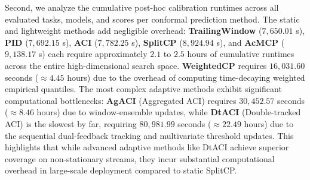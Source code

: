 \documentclass[12pt, a4paper]{article}
\begin{document}
Second, we analyze the cumulative post-hoc calibration runtimes across all evaluated tasks, models, and scores per conformal prediction method. The static and lightweight methods add negligible overhead: \textbf{TrailingWindow} (\(7,650.01\) s), \textbf{PID} (\(7,692.15\) s), \textbf{ACI} (\(7,782.25\) s), \textbf{SplitCP} (\(8,924.94\) s), and \textbf{AcMCP} (\(9,138.17\) s) each require approximately \(2.1\) to \(2.5\) hours of cumulative runtimes across the entire high-dimensional search space. \textbf{WeightedCP} requires \(16,031.60\) seconds (\(\approx 4.45\) hours) due to the overhead of computing time-decaying weighted empirical quantiles. The most complex adaptive methods exhibit significant computational bottlenecks: \textbf{AgACI} (Aggregated ACI) requires \(30,452.57\) seconds (\(\approx 8.46\) hours) due to window-ensemble updates, while \textbf{DtACI} (Double-tracked ACI) is the slowest by far, requiring \(80,981.99\) seconds (\(\approx 22.49\) hours) due to the sequential dual-feedback tracking and multivariate threshold updates. This highlights that while advanced adaptive methods like DtACI achieve superior coverage on non-stationary streams, they incur substantial computational overhead in large-scale deployment compared to static SplitCP.
\end{document}
